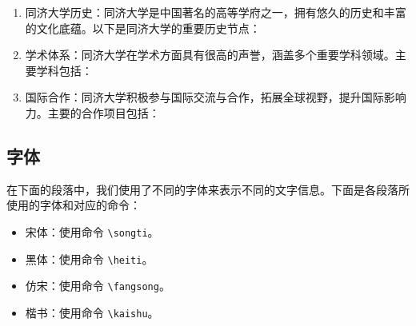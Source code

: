 \begin{enumerate}
    \item 同济大学历史：同济大学是中国著名的高等学府之一，拥有悠久的历史和丰富的文化底蕴。以下是同济大学的重要历史节点：
    \item 学术体系：同济大学在学术方面具有很高的声誉，涵盖多个重要学科领域。主要学科包括：
    \item 国际合作：同济大学积极参与国际交流与合作，拓展全球视野，提升国际影响力。主要的合作项目包括：
\end{enumerate}

\subsection{字体}

在下面的段落中，我们使用了不同的字体来表示不同的文字信息。下面是各段落所使用的字体和对应的命令：

\begin{itemize}
    \item {\songti 宋体}：使用命令 \texttt{\textbackslash songti}。
    \item {\heiti 黑体}：使用命令 \texttt{\textbackslash heiti}。
    \item {\fangsong 仿宋}：使用命令 \texttt{\textbackslash fangsong}。
    \item {\kaishu 楷书}：使用命令 \texttt{\textbackslash kaishu}。
\end{itemize}

